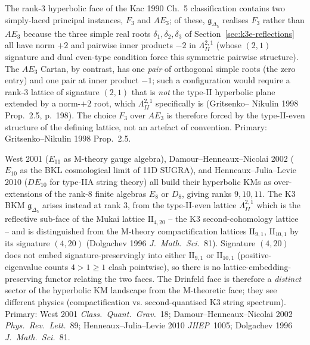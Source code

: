 \begin{remark}
\label{rem:bkm-F3-vs-AE3-origin}
The rank-$3$ hyperbolic face of the Kac 1990 Ch.~5 classification
contains two simply-laced principal instances, $F_3$ and $AE_3$; of these,
$\mathfrak{g}_{\Delta_5}$ realises $F_3$ rather than $AE_3$ because
the three simple real roots
$\delta_1, \delta_2, \delta_3$ of
Section~\ref{sec:k3e-reflections} all have norm $+2$ and pairwise
inner products $-2$ in $\Lambda^{2,1}_{II}$ (whose $(2,1)$ signature
and dual even-type condition force this symmetric pairwise structure).
The $AE_3$ Cartan, by contrast, has one \emph{pair} of orthogonal
simple roots (the zero entry) and one pair at inner product $-1$;
such a configuration would require a rank-$3$ lattice of signature
$(2, 1)$ that is \emph{not} the type-II hyperbolic plane extended by a
norm-$+2$ root, which $\Lambda^{2,1}_{II}$ specifically is (Gritsenko--
Nikulin 1998 Prop.~2.5, p.~198). The choice $F_3$ over $AE_3$ is
therefore forced by the type-II-even structure of the defining
lattice, not an artefact of convention. Primary: Gritsenko--Nikulin
1998 Prop.~2.5.
\end{remark}

\begin{remark}
\label{rem:bkm-m-theory-face}
West 2001 ($E_{11}$ as M-theory gauge algebra),
Damour--Henneaux--Nicolai 2002 ($E_{10}$ as the BKL cosmological
limit of 11D SUGRA), and Henneaux--Julia--Levie 2010 ($DE_{10}$ for
type-IIA string theory) all build their hyperbolic KMs as
over-extensions of the rank-$8$ finite algebras $E_8$ or $D_8$, giving
ranks $9, 10, 11$. The K3 BKM $\mathfrak{g}_{\Delta_5}$ arises
instead at rank $3$, from the type-II-even lattice
$\Lambda^{2,1}_{II}$ which is the reflective sub-face of the Mukai
lattice $\mathrm{II}_{4,20}$ -- the K3 second-cohomology lattice
-- and is distinguished from the M-theory compactification lattices
$\mathrm{II}_{9,1}$, $\mathrm{II}_{10,1}$ by its signature $(4, 20)$
(Dolgachev 1996 \emph{J.\ Math.\ Sci.}~81). Signature $(4, 20)$ does
not embed signature-preservingly into either $\mathrm{II}_{9,1}$ or
$\mathrm{II}_{10,1}$ (positive-eigenvalue counts $4 > 1 \geq 1$ clash
pointwise), so there is no lattice-embedding-preserving functor
relating the two faces. The Drinfeld face is therefore a
\emph{distinct} sector of the hyperbolic KM landscape from the
M-theoretic face; they see different physics (compactification vs.
second-quantised K3 string spectrum). Primary: West 2001
\emph{Class.\ Quant.\ Grav.}~18; Damour--Henneaux--Nicolai 2002
\emph{Phys.\ Rev.\ Lett.}~89; Henneaux--Julia--Levie 2010
\emph{JHEP}~1005; Dolgachev 1996 \emph{J.\ Math.\ Sci.}~81.
\end{remark}

